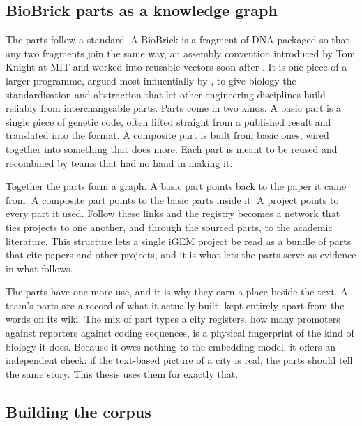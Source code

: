 \documentclass[12pt,a4paper]{article}
\begin{document}
	\subsection{BioBrick parts as a knowledge graph}
	
	The parts follow a standard. A BioBrick is a fragment of DNA packaged so that any
	two fragments join the same way, an assembly convention introduced by Tom Knight at
	MIT and worked into reusable vectors soon after
	\citep{shettyEngineeringBioBrickVectors2008}. It is one piece of a larger
	programme, argued most influentially by \citet{endyFoundationsEngineeringBiology2005},
	to give biology the standardisation and abstraction that let other engineering
	disciplines build reliably from interchangeable parts. Parts come in two kinds. A
	basic part is a single piece of genetic code, often lifted straight from a published
	result and translated into the format. A composite part is built from basic ones,
	wired together into something that does more. Each part is meant to be reused and
	recombined by teams that had no hand in making it.
	
	Together the parts form a graph. A basic part points back to the paper it came
	from. A composite part points to the basic parts inside it. A project points to
	every part it used. Follow these links and the registry becomes a network that
	ties projects to one another, and through the sourced parts, to the academic
	literature. This structure lets a single iGEM project be read as a bundle of parts
	that cite papers and other projects, and it is what lets the parts serve as
	evidence in what follows.
	
	The parts have one more use, and it is why they earn a place beside the text. A
	team's parts are a record of what it actually built, kept entirely apart from the
	words on its wiki. The mix of part types a city registers, how many promoters
	against reporters against coding sequences, is a physical fingerprint of the kind
	of biology it does. Because it owes nothing to the embedding model, it offers an
	independent check: if the text-based picture of a city is real, the parts should
	tell the same story. This thesis uses them for exactly that.
	
	\subsection{Building the corpus}
	
\end{document}
